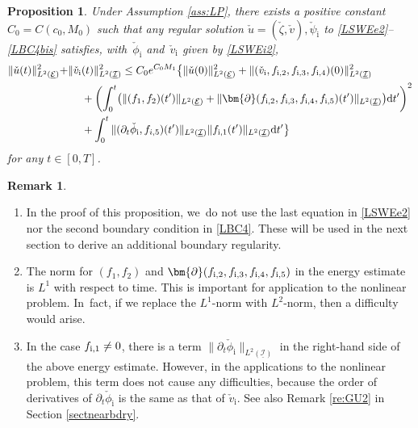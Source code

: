 \documentclass[JEP,XML,SOM,Unicode,NoFloatCountersInSection,published]{cedram}
\newenvironment{enumeratei}
{\bgroup\def\theenumi{\roman{enumi}}\def\theenumii{\arabic{enumii}}\begin{enumerate}}
{\end{enumerate}\egroup}
\newcommand{\dt}{\partial_t}
\newcommand{\cI}{{\mathcal I}}
\newcommand{\cE}{{\mathcal E}}
\newcommand{\ul}[1]{\underline{#1}}
\newtheorem{proposition}[theorem]{Proposition}
\theoremstyle{definition}
\newtheorem{remark}[theorem]{Remark}
\begin{document}
\begin{proposition}\label{prop:BEE}
Under Assumption \ref{ass:LP}, there exists a positive constant $C_0=C(c_0,M_0)$ such that any regular solution
$\check{u}=(\check{\zeta},\check{v}), \check{\psi}_\mathrm{i}$ to \eqref{LSWEe2}--\eqref{LBC4bis} satisfies,
with~$\check{\phi}_\mathrm{i}$ and~$\check{v}_\mathrm{i}$ given by \eqref{LSWEi2},
\begin{align*}
\|\check{u}(t)\|_{L^2(\ul{\cE})}^2 +& \|\check{v}_\mathrm{i}(t)\|_{L^2(\ul{\cI})}^2
\leq C_0 e^{C_0M_1}\bigl\{ \|\check{u}(0)\|_{L^2(\ul{\cE})}^2 + \|(\check{v}_\mathrm{i},f_{{\rm i},2},f_{{\rm i},3},f_{{\rm i},4})(0)\|_{L^2(\ul{\cI})}^2 \\
&\quad\;
+ \left(\int_0^t \bigl(\|(f_1,f_2)(t')\|_{L^2(\ul{\cE})}
+ \|\bm{\partial}(f_{{\rm i},2},f_{{\rm i},3},f_{{\rm i},4},f_{{\rm i},5})(t')\|_{L^2(\ul{\cI})} \bigr){\rm d}t' \right)^2\\
&\quad\;
+ \int_0^t\|(\dt\check{\phi}_\mathrm{i},f_{i,5})(t')\|_{L^2(\ul{\cI})}\|f_{{\rm i},1}(t')\|_{L^2(\ul{\cI})}{\rm d}t' \bigr\}
\end{align*}
for any $t\in[0,T]$.
\end{proposition}

\skpt
\begin{remark}
\begin{enumeratei}
\item
In the proof of this proposition, we~do not use the last equation in \eqref{LSWEe2} nor the second boundary condition in \eqref{LBC4}.
These will be used in the next section to derive an additional boundary regularity.

\item
The norm for $(f_1,f_2)$ and $\bm{\partial}(f_{{\rm i},2},f_{{\rm i},3},f_{{\rm i},4},f_{{\rm i},5})$ in the energy estimate is $L^1$ with respect to time.
This is important for application to the nonlinear problem. In~fact, if we replace the $L^1$-norm with $L^2$-norm, then a difficulty would arise.

\item
In the case $f_{{\rm i},1}\ne0$, there is a term $\|\dt\check{\phi}_\mathrm{i}\|_{L^2(\ul{\cI})}$ in the right-hand side of the above energy estimate.
However, in the applications to the nonlinear problem, this term does not cause any difficulties,
because the order of derivatives of $\dt\check{\phi}_\mathrm{i}$ is the same as that of $\check{v}_\mathrm{i}$.
See also Remark \ref{re:GU2} in Section \ref{sectnearbdry}.
\end{enumeratei}
\end{remark}
\end{document}
